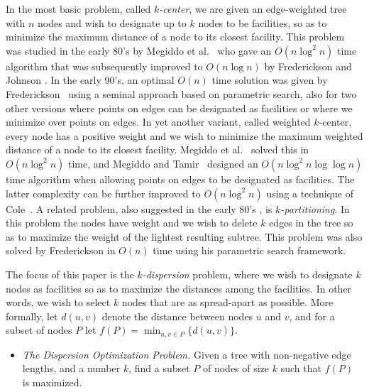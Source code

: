 \documentclass[11pt,a4paper]{article}
\newcommand{\Oh}{{O}}
\theoremstyle{definition}
\theoremstyle{remark}
\begin{document}
In the most basic problem, called \emph{$k$-center}, we are given an edge-weighted tree with $n$ nodes and wish to designate up to $k$ nodes to be facilities, so as to minimize the maximum distance of a node to its closest facility. This problem was studied in the early 80's by Megiddo et al.~\cite{Megiddo1981} who gave an $\Oh(n\log^2n)$ time algorithm that was subsequently improved to $\Oh(n\log n)$ by Frederickson and Johnson \cite{Frederickson1983}.
In the early 90's, an optimal $\Oh(n)$ time solution was given by Frederickson~\cite{Frederickson1991a,Frederickson1990} using a seminal approach based on
parametric search, also for two other versions where points on edges can be designated as facilities or where we minimize over points on edges.
In yet another variant, called weighted $k$-center, every node has a positive weight and we wish to minimize the maximum weighted distance of a node to its closest facility. Megiddo et al.~\cite{Megiddo1981} solved this in $\Oh(n\log^{2}n)$ time, and
Megiddo and Tamir~\cite{Megiddo1983} designed an $\Oh(n\log^{2}n\log\log n)$ time algorithm when allowing points on edges to be
designated as facilities. The latter complexity can be further improved to $\Oh(n\log^{2}n)$ using a technique of Cole~\cite{Cole87}. 
%
A related problem, also suggested in the early 80's  \cite{Becker1982,Perl1981}, is \emph{$k$-partitioning}. In this problem the nodes have weight and we wish to delete $k$ edges in the tree so as to maximize the weight of the lightest resulting subtree. This problem was also solved by Frederickson in $\Oh(n)$ time \cite{Frederickson1991} using his parametric search framework. 
%


The focus of this paper is the  {\em $k$-dispersion} problem, where we wish to designate $k$ nodes as facilities so as to maximize the distances among the facilities. In other words, we wish to select $k$ nodes that are as spread-apart as possible. More formally, let $d(u,v)$ denote the distance between nodes $u$ and $v$, and for a subset of nodes $P$ let $f(P)=\min_{u,v\in P} \{d(u,v)\}$.

\begin{itemize} 
\item {\em The Dispersion Optimization Problem.} Given a tree with non-negative edge lengths, and a number $k$, find a subset $P$ of nodes of size $k$ such that $f(P)$ is maximized.
\end{itemize}
\end{document}
